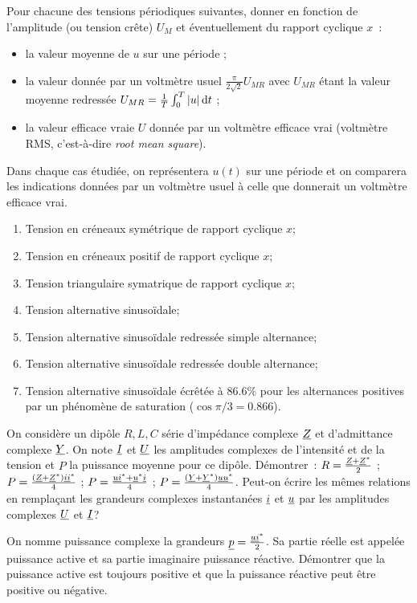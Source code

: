 \begin{exercice}%
  Pour chacune des tensions périodiques suivantes, donner en fonction de 
  l'amplitude (ou tension crête) \(U_M\) et éventuellement du rapport cyclique 
  \(x\)~:
  \begin{itemize}
    \item la valeur moyenne de \(u\) sur une période ;
    \item la valeur donnée par un voltmètre usuel \(\frac{\pi}{2\sqrt{2}} 
      U_{MR}\) avec \(U_{MR}\) étant la valeur moyenne redressée \(U_{MR} = 
      \frac{1}{T} \int_0^T \left\lvert u\right\rvert \mathrm{d} t\) ;
    \item la valeur efficace vraie \(U\) donnée par un voltmètre efficace vrai 
      (voltmètre RMS, c'est-à-dire \emph{root mean square}).
  \end{itemize}

  Dans chaque cas étudiée, on représentera \(u(t)\) sur une période et on 
  comparera les indications données par un voltmètre usuel à celle que 
  donnerait un voltmètre efficace vrai.
  \begin{enumerate}
    \item Tension en créneaux symétrique de rapport cyclique \(x\);
    \item Tension en créneaux positif de rapport cyclique \(x\);
    \item Tension triangulaire symatrique de rapport cyclique \(x\);
    \item Tension alternative sinusoïdale;
    \item Tension alternative sinusoïdale redressée simple alternance;
    \item Tension alternative sinusoïdale redressée double alternance;
    \item Tension alternative sinusoïdale écrêtée à \(86.6\%\) pour les 
      alternances positives par un phénomène de saturation (\(\cos\pi/3 = 
      0.866\)).
  \end{enumerate}
\end{exercice}%
\begin{exercice}%
  On considère un dipôle \(R, L, C\) série d'impédance complexe \(\underline{Z}\) et 
  d'admittance complexe \(\underline{Y}\). On note \(\underline{I}\) et \(\underline{U}\) les amplitudes 
  complexes de l'intensité et de la tension et \(P\) la puissance moyenne pour 
  ce dipôle. Démontrer~: \(R = \frac{\underline{Z} + \underline{Z}^*}{2}\) ; \(P = \frac{(\underline{Z} + 
  \underline{Z}^*)\underline{i} \underline{i}^*}{4}\) ; \(P = \frac{\underline{u}\underline{i}^* + \underline{u}^*\underline{i}}{4}\) ; \(P = 
  \frac{(\underline{Y}+\underline{Y}^*)\underline{u}\underline{u}^*}{4}\). Peut-on écrire les mêmes relations en 
  remplaçant les grandeurs complexes instantanées \(\underline{i}\) et \(\underline{u}\) par les 
  amplitudes complexes \(\underline{U}\) et \(\underline{I}\)?

  On nomme puissance complexe la grandeurs \(\underline{p} = \frac{\underline{u} \underline{i}^*}{2}\). Sa 
  partie réelle est appelée puissance active et sa partie imaginaire puissance 
  réactive. Démontrer que la puissance active est toujours positive et que la 
  puissance réactive peut être positive ou négative.
\end{exercice}%
